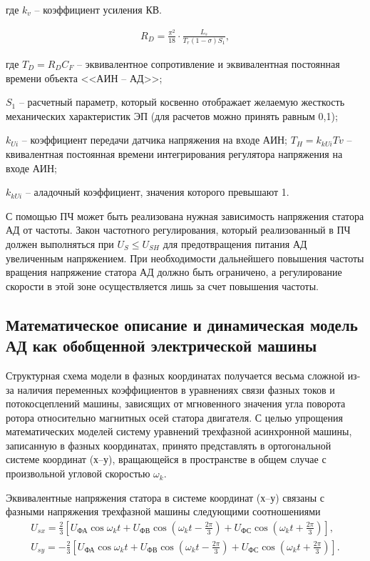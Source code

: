         где $k_v$ -- коэффициент усиления КВ.

        \begin{gather*}
            R_D = \frac{\pi^2}{18} \cdot \frac{L_s}{T_r(1 - \sigma)S_1},
        \end{gather*}

        где $T_D=R_D C_F$ -- эквивалентное сопротивление и эквивалентная
        постоянная времени объекта <<АИН -- АД>>;\par
        $S_1$ -- расчетный параметр,
        который косвенно отображает желаемую жесткость механических
        характеристик ЭП (для расчетов можно принять равным 0,1);\par
        $k_{Ui}$ -- коэффициент передачи датчика напряжения на входе АИН; 
        $T_H = k_{kUi}Tv$ --квивалентная постоянная времени интегрирования
            регулятора напряжения на входе АИН;\par
        $k_{kUi}$ -- аладочный коэффициент, значения которого превышают 1. 

        С помощью ПЧ может быть реализована нужная зависимость напряжения
        статора АД от частоты. Закон частотного регулирования, который
        реализованный в ПЧ должен выполняться при $U_S \leq U_{SH}$ для
        предотвращения питания АД увеличенным напряжением. При необходимости
        дальнейшего повышения частоты вращения напряжение статора АД должно
        быть ограничено, а регулирование скорости в этой зоне осуществляется
        лишь за счет повышения частоты.

    \subsection{Математическое описание и динамическая модель АД как обобщенной
        электрической машины}

        Структурная схема модели в фазных координатах получается весьма сложной
        из-за наличия переменных коэффициентов в уравнениях связи фазных токов
        и потокосцеплений машины, зависящих от мгновенного значения угла
        поворота ротора относительно магнитных осей статора двигателя. С целью
        упрощения математических моделей систему уравнений трехфазной
        асинхронной машины, записанную в фазных координатах, принято
        представлять в ортогональной системе координат (х–у), вращающейся в
        пространстве в общем случае с произвольной угловой скоростью $\omega_k$.

        Эквивалентные напряжения статора в системе координат (х–у) связаны с
        фазными напряжения трехфазной машины следующими соотношениями
        \begin{gather*}
            U_{sx} = \frac{2}{3} \left[ U_\text{ФА}\cos\omega_k t+U_\text{ФВ}
                \cos\left(\omega_k t-\frac{2\pi}{3}\right)+U_\text{ФС} \cos
                    \left( \omega_k t+\frac{2\pi}{3}\right)\right],\\
            U_{sy} = -\frac{2}{3} \left[ U_\text{ФА}\cos\omega_k t+U_\text{ФВ}
                \cos\left(\omega_k t-\frac{2\pi}{3}\right)+U_\text{ФС} \cos
                    \left( \omega_k t+\frac{2\pi}{3}\right)\right].\\
        \end{gather*}

